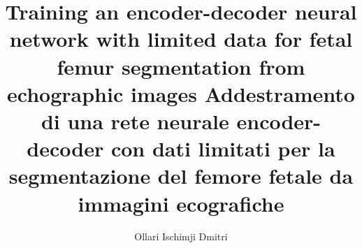 \documentclass[12pt]{article}
\begin{document}
\title{
	Training an encoder-decoder neural network with limited data for fetal femur segmentation from echographic images \newline
	\large Addestramento di una rete neurale encoder-decoder con dati limitati per la segmentazione del femore fetale da immagini ecografiche}
\author{Ollari Ischimji Dmitri}

\maketitle

\newpage

\tableofcontents
\listoffigures
\listoftables

\newpage






\newpage


\end{document}
